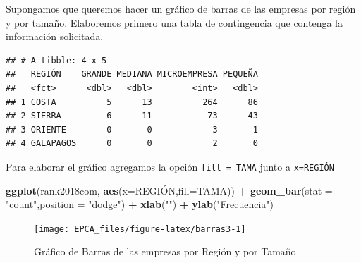 \documentclass[letterpaper,]{book}
\newenvironment{Shaded}{\begin{snugshade}}{\end{snugshade}}
\newcommand{\DataTypeTok}[1]{\textcolor[rgb]{0.13,0.29,0.53}{#1}}
\newcommand{\DecValTok}[1]{\textcolor[rgb]{0.00,0.00,0.81}{#1}}
\newcommand{\KeywordTok}[1]{\textcolor[rgb]{0.13,0.29,0.53}{\textbf{#1}}}
\newcommand{\NormalTok}[1]{#1}
\newcommand{\OperatorTok}[1]{\textcolor[rgb]{0.81,0.36,0.00}{\textbf{#1}}}
\newcommand{\StringTok}[1]{\textcolor[rgb]{0.31,0.60,0.02}{#1}}
\begin{document}
Supongamos que queremos hacer un gráfico de barras de las empresas por región y por tamaño. Elaboremos primero una tabla de contingencia que contenga la información solicitada.

\begin{Shaded}
\end{Shaded}

\begin{verbatim}
## # A tibble: 4 x 5
##   REGIÓN    GRANDE MEDIANA MICROEMPRESA PEQUEÑA
##   <fct>      <dbl>   <dbl>        <int>   <dbl>
## 1 COSTA          5      13          264      86
## 2 SIERRA         6      11           73      43
## 3 ORIENTE        0       0            3       1
## 4 GALAPAGOS      0       0            2       0
\end{verbatim}

Para elaborar el gráfico agregamos la opción \texttt{fill\ =\ TAMA} junto a \texttt{x=REGIÓN}

\begin{Shaded}
\begin{Highlighting}[]
\KeywordTok{ggplot}\NormalTok{(rank2018com, }\KeywordTok{aes}\NormalTok{(}\DataTypeTok{x=}\NormalTok{REGIÓN,}\DataTypeTok{fill=}\NormalTok{TAMA)) }\OperatorTok{+}\StringTok{ }
\StringTok{  }\KeywordTok{geom_bar}\NormalTok{(}\DataTypeTok{stat =} \StringTok{"count"}\NormalTok{,}\DataTypeTok{position =} \StringTok{"dodge"}\NormalTok{) }\OperatorTok{+}
\StringTok{  }\KeywordTok{xlab}\NormalTok{(}\StringTok{""}\NormalTok{) }\OperatorTok{+}\StringTok{ }\KeywordTok{ylab}\NormalTok{(}\StringTok{"Frecuencia"}\NormalTok{)}
\end{Highlighting}
\end{Shaded}

\begin{figure}[h!]

{\centering \texttt{[image: EPCA\_files/figure-latex/barras3-1]} 

}

\caption{Gráfico de Barras de las empresas por Región y por Tamaño}\label{fig:barras3}
\end{figure}
\end{document}
